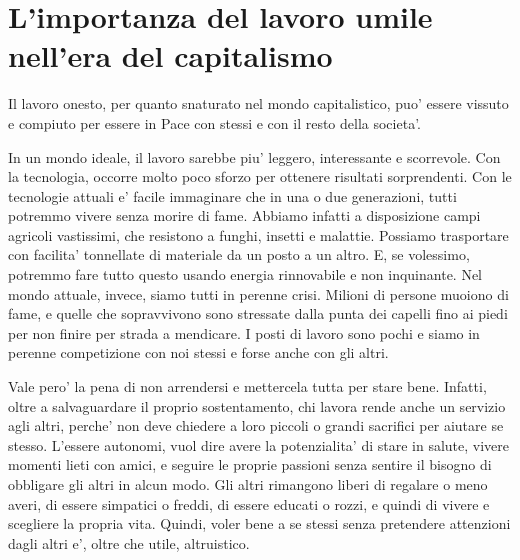 \chapter{L'importanza del lavoro umile nell'era del capitalismo}
\label{altruismoLavoro}

Il lavoro onesto, per quanto snaturato nel mondo capitalistico, puo' essere vissuto e compiuto per essere in Pace con stessi e con il resto della societa'. 

In un mondo ideale, il lavoro sarebbe piu' leggero, interessante e scorrevole. Con la tecnologia, occorre molto poco sforzo per ottenere risultati sorprendenti. Con le tecnologie attuali e' facile immaginare che in una o due generazioni, tutti potremmo vivere senza morire di fame. Abbiamo infatti a disposizione campi agricoli vastissimi, che resistono a funghi, insetti e malattie. Possiamo trasportare con facilita' tonnellate di materiale da un posto a un altro. E, se volessimo, potremmo fare tutto questo usando energia rinnovabile e non inquinante. Nel mondo attuale, invece, siamo tutti in perenne crisi. Milioni di persone muoiono di fame, e quelle che sopravvivono sono stressate dalla punta dei capelli fino ai piedi per non finire per strada a mendicare. I posti di lavoro sono pochi e siamo in perenne competizione con noi stessi e forse anche con gli altri.

Vale pero' la pena di non arrendersi e mettercela tutta per stare bene. Infatti, oltre a salvaguardare il proprio sostentamento, chi lavora rende anche un servizio agli altri, perche' non deve chiedere a loro piccoli o grandi sacrifici per aiutare se stesso. 
L'essere autonomi, vuol dire avere la potenzialita' di stare in salute, vivere momenti lieti con amici, e seguire le proprie passioni senza sentire il bisogno di obbligare gli altri in alcun modo. Gli altri rimangono liberi di regalare o meno averi, di essere simpatici o freddi, di essere educati o rozzi, e quindi di vivere e scegliere la propria vita.
Quindi, voler bene a se stessi senza pretendere attenzioni dagli altri e', oltre che utile, altruistico. 

